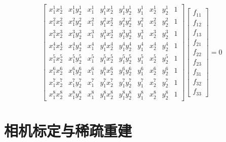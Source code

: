 \documentclass[12pt]{article}
\begin{document}
\begin{equation}
    \left[\begin{array}{ccccccccc}
        x_{1}^{1} x_{2}^{1} & x_{1}^{1} y_{2}^{1} & x_{1}^{1} & y_{1}^{1} x_{2}^{1} & y_{1}^{1} y_{2}^{1} & y_{1}^{1} & x_{2}^{1} & y_{2}^{1} & 1 \\
        x_{1}^{2} x_{2}^{2} & x_{1}^{2} y_{2}^{2} & x_{1}^{2} & y_{1}^{2} x_{2}^{2} & y_{1}^{2} y_{2}^{2} & y_{1}^{2} & x_{2}^{2} & y_{2}^{2} & 1 \\
        x_{1}^{3} x_{2}^{3} & x_{1}^{3} y_{2}^{3} & x_{1}^{3} & y_{1}^{3} x_{2}^{3} & y_{1}^{3} y_{2}^{3} & y_{1}^{3} & x_{2}^{3} & y_{2}^{3} & 1 \\
        x_{1}^{4} x_{2}^{4} & x_{1}^{4} y_{2}^{4} & x_{1}^{4} & y_{1}^{4} x_{2}^{4} & y_{1}^{4} y_{2}^{4} & y_{1}^{4} & x_{2}^{4} & y_{2}^{4} & 1 \\
        x_{1}^{5} x_{2}^{5} & x_{1}^{5} y_{2}^{5} & x_{1}^{5} & y_{1}^{5} x_{2}^{5} & y_{1}^{5} y_{2}^{5} & y_{1}^{5} & x_{2}^{5} & y_{2}^{5} & 1 \\
        x_{1}^{6} x_{2}^{6} & x_{1}^{6} y_{2}^{6} & x_{1}^{6} & y_{1}^{6} x_{2}^{6} & y_{1}^{6} y_{2}^{6} & y_{1}^{6} & x_{2}^{6} & y_{2}^{6} & 1 \\
        x_{1}^{7} x_{2}^{7} & x_{1}^{7} y_{2}^{7} & x_{1}^{7} & y_{1}^{7} x_{2}^{7} & y_{1}^{7} y_{2}^{7} & y_{1}^{7} & x_{2}^{7} & y_{2}^{7} & 1 \\
        x_{1}^{8} x_{2}^{8} & x_{1}^{8} y_{2}^{8} & x_{1}^{8} & y_{1}^{8} x_{2}^{8} & y_{1}^{8} y_{2}^{8} & y_{1}^{8} & x_{2}^{8} & y_{2}^{8} & 1
        \end{array}\right]\left[\begin{array}{c}
            f_{11} \\
            f_{12} \\
            f_{13} \\
            f_{21} \\
            f_{22} \\
            f_{23} \\
            f_{31} \\
            f_{32} \\
            f_{33}
            \end{array}\right]=0
\end{equation}

\newpage
\section{相机标定与稀疏重建}
\newpage
\end{document}
